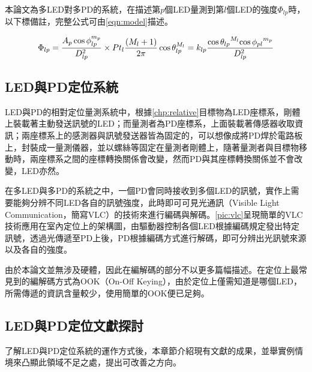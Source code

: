     本論文為多LED對多PD的系統，在描述第$p$個LED量測到第$l$個LED的強度$\Phi_{lp}$時，以下標備註，完整公式可由\ref{eqn:model}描述。
    
    \begin{equation}
        \label{eqn:model}
        \Phi_{lp}=\frac{ A_p\cos\phi_{lp}^{m_{p}} }{D^2_{lp}}\times Pt_l\frac{(M_{l}+1)}{2 \pi} \cos \theta_{lp}^{M_{l}}  \\
        =k_{lp}\frac{{\cos\theta_{lp}}^{M_{l}}{\cos\phi_{pl}}^{m_{p}}}{D_{lp}^2}\\
    \end{equation}

    

        
    

        



    \subsection{LED與PD定位系統}

        LED與PD的相對定位量測系統中，根據\ref{chp:relative}目標物為LED座標系，剛體上裝載著主動發送訊號的LED；而量測者為PD座標系，上面裝載著傳感器收取資訊；兩座標系上的感測器與訊號發送器皆為固定的，可以想像成將PD焊於電路板上，封裝成一量測儀器，並以螺絲等固定在量測者剛體上，隨著量測者與目標物移動時，兩座標系之間的座標轉換關係會改變，然而PD與其座標轉換關係並不會改變，LED亦然。

        
        在多LED與多PD的系統之中，一個PD會同時接收到多個LED的訊號，實作上需要能夠分辨不同LED各自的訊號強度，此時即可可見光通訊（Visible Light Communication，簡寫VLC）的技術\cite{vlc}來進行編碼與解碼。\ref{pic:vlc}呈現簡單的VLC技術應用在室內定位上的架構圖，由驅動器控制各個LED根據編碼規定發出特定訊號，透過光傳遞至PD上後，PD根據編碼方式進行解碼，即可分辨出光訊號來源以及各自的強度。
        
        由於本論文並無涉及硬體，因此在編解碼的部分不以更多篇幅描述。在定位上最常見到的編解碼方式為OOK（On-Off Keying），由於定位上僅需知道是哪個LED，所需傳遞的資訊含量較少，使用簡單的OOK便已足夠。
        
        


    \subsection{LED與PD定位文獻探討}

        了解LED與PD定位系統的運作方式後，本章節介紹現有文獻的成果，並舉實例情境來凸顯此領域不足之處，提出可改善之方向。


